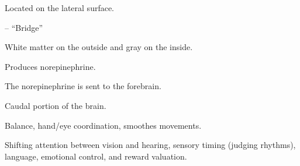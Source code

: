 \begin{coloredlist}
\begin{coloredlist}
\begin{coloredlist}
\begin{coloredlist}
                \item Located on the lateral surface.
            \end{coloredlist}
        \end{coloredlist}
    \end{coloredlist}
    \item {}
    \begin{coloredlist}
        \item {} -- ``Bridge''
        \begin{coloredlist}
            \item White matter on the outside and gray on the inside.
            \item {}
            \begin{coloredlist}
                \item Produces norepinephrine.
                \item The norepinephrine is sent to the forebrain.
            \end{coloredlist}
        \end{coloredlist}
        \item {}
        \begin{coloredlist}
            \item Caudal portion of the brain.
            \item Balance, hand/eye coordination, smoothes movements.
            \item Shifting attention between vision and hearing, sensory timing (judging rhythms), language, emotional control, and reward valuation.
        \end{coloredlist}
    \end{coloredlist}
\end{coloredlist}